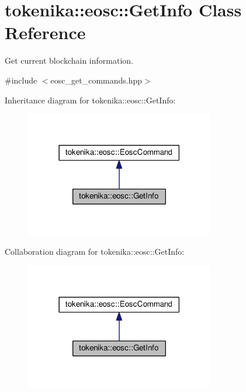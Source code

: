 \hypertarget{classtokenika_1_1eosc_1_1_get_info}{}\section{tokenika\+:\+:eosc\+:\+:Get\+Info Class Reference}
\label{classtokenika_1_1eosc_1_1_get_info}


Get current blockchain information.  




{\ttfamily \#include $<$eosc\+\_\+get\+\_\+commands.\+hpp$>$}



Inheritance diagram for tokenika\+:\+:eosc\+:\+:Get\+Info\+:\nopagebreak
\begin{figure}[H]
\begin{center}
\leavevmode
\includegraphics[width=234pt]{classtokenika_1_1eosc_1_1_get_info__inherit__graph}
\end{center}
\end{figure}


Collaboration diagram for tokenika\+:\+:eosc\+:\+:Get\+Info\+:\nopagebreak
\begin{figure}[H]
\begin{center}
\leavevmode
\includegraphics[width=234pt]{classtokenika_1_1eosc_1_1_get_info__coll__graph}
\end{center}
\end{figure}

